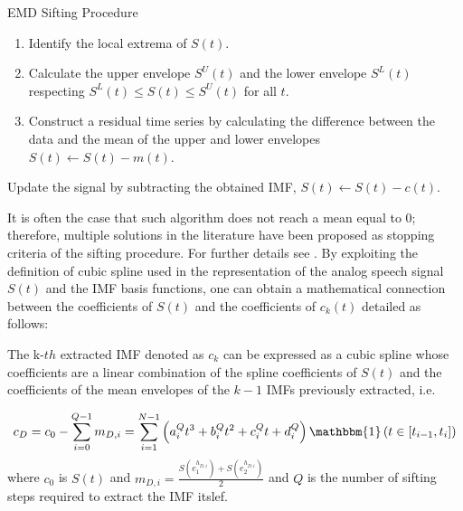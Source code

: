 \begin{algorithm}[H]
\small

\label{sifting_algorithm}
\caption{EMD Sifting Procedure}

\BlankLine
\addtolength\linewidth{-12ex}

 
{
{
\begin{enumerate}[label=(\roman*)]

\item Identify the local extrema of $S(t)$.  %
\item Calculate the upper envelope $S^U(t)$ and the lower envelope $S^L(t)$ respecting $S^L(t) \leq S(t) \leq S^U(t)$ for all $t$. 
%
\item Construct a residual time series by calculating the difference between the data and the mean of the upper and lower envelopes $S(t)\leftarrow S(t) - m(t)$.

\end{enumerate}
}



Update the signal by subtracting the obtained IMF, $S(t) \leftarrow S(t)-c(t)$. 
\BlankLine
\BlankLine

}
\end{algorithm}

\normalsize

It is often the case that such algorithm does not reach a mean equal to 0; therefore, multiple solutions in the literature have been proposed as stopping criteria of the sifting procedure. For further details see \cite{Machine}. By exploiting the definition of cubic spline used in the representation of the analog speech signal $S(t)$ and the IMF basis functions, one can obtain a mathematical connection between the coefficients of $S(t)$ and the coefficients of $c_k(t)$ detailed as follows: 

\begin{prop}
\label{prop_cs}
The k-$th$ extracted IMF denoted as $c_k$ can be expressed as a cubic spline whose coefficients are a linear combination of the spline coefficients of $S(t)$ and the coefficients of the mean envelopes of the $k-1$ IMFs previously extracted, i.e.

\begin{equation}
c_D = c_0 - \sum_{i=0}^{Q-1} m_{D,i} = \sum_{i=1}^{N-1} \left( a_i^Q t^3 + b_i^Q t^2 + c_i^Q t + d_i^Q \right) \mathbbm{1} \left( t \in \left[ t_{i-1}, t_i \right] \right)
\end{equation}
where $c_0$ is $S(t)$ and $m_{D,i} = \frac{S(e_1^{h_{D,i}})+S(e_2^{h_{D,i}})}{2}$ and $Q$ is the number of sifting steps required to extract the IMF itslef.
\end{prop}

